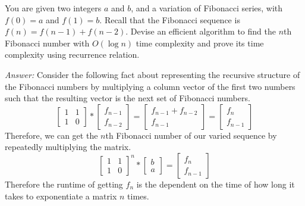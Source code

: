 \documentclass[12pt]{article}
\newenvironment{problem}[2][Problem]{\begin{trivlist}
\item[\hskip \labelsep {\bfseries #1}\hskip \labelsep {\bfseries #2.}]}{\end{trivlist}}
\begin{document}
\begin{problem}{4}
    You are given two integers $a$ and $b$, and a variation of Fibonacci series, with $f(0)=a$ and $f(1)=b$. Recall that the Fibonacci sequence is $f(n)=f(n-1)+f(n-2)$. Devise an efficient algorithm to find the $n$th Fibonacci number with $O(\log n)$ time complexity and prove its time complexity using recurrence relation.
\end{problem}
\textit{Answer:}
Consider the following fact about representing the recursive structure of the Fibonacci numbers by multiplying a column vector of the first two numbers such that the resulting vector is the next set of Fibonacci numbers.
$$
\begin{bmatrix}
    1 & 1 \\
    1 & 0 
\end{bmatrix} *
\begin{bmatrix}
    f_{n-1} \\
    f_{n-2}
\end{bmatrix} =
\begin{bmatrix}
    f_{n-1} + f_{n-2} \\
    f_{n-1}
\end{bmatrix} =
\begin{bmatrix}
    f_{n} \\
    f_{n-1}
\end{bmatrix}
$$
Therefore, we can get the $n$th Fibonacci number of our varied sequence by repeatedly multiplying the matrix.
$$
\begin{bmatrix}
    1 & 1 \\
    1 & 0 
\end{bmatrix} ^n *
\begin{bmatrix}
    b \\
    a
\end{bmatrix} = 
\begin{bmatrix}
    f_{n} \\
    f_{n-1}
\end{bmatrix} 
$$
Therefore the runtime of getting $f_n$ is the dependent on the time of how long it takes to exponentiate a matrix $n$ times.
\end{document}
